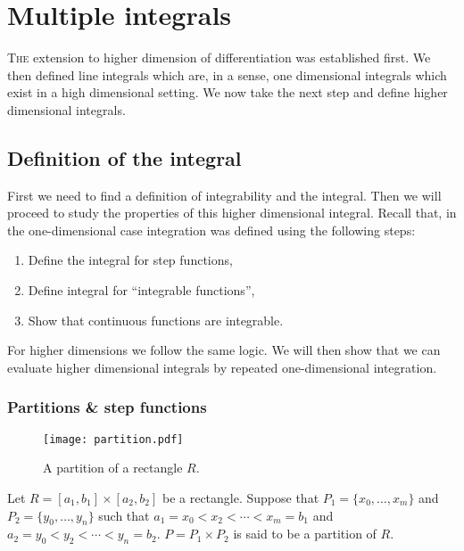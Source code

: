 \chapter{Multiple integrals}

\lettrine{T}{he} extension to higher dimension of differentiation was established first.
We then defined line integrals which are, in a sense, one dimensional integrals which exist in a high dimensional setting.
We now take the next step and define higher dimensional integrals.

\section{Definition of the integral}

First we need to find a definition of integrability and the integral.
Then we will proceed to study the properties of this higher dimensional integral.
Recall that, in the one-dimensional case integration was defined using the following steps:
\begin{enumerate}
    \item Define the integral for step functions,
    \item Define integral for ``integrable functions'',
    \item Show that continuous functions are integrable.
\end{enumerate}
For higher dimensions we follow the same logic.
We will then show that we can evaluate higher dimensional integrals by repeated one-dimensional integration.

\subsection{Partitions \& step functions}

\begin{figure}
    \centering
    \texttt{[image: partition.pdf]}
    \caption{A partition of a rectangle \(R\).}
\end{figure}

\begin{definition*}[partition]
    Let \(R = [a_1,b_1] \times [a_2,b_2]\) be a rectangle.
    Suppose that \(P_1 = \{x_0,\ldots,x_m\}\) and \(P_2 = \{y_0,\ldots,y_n\}\) such that
    \(a_1 = x_0 < x_2 < \cdots < x_m = b_1\) and \(a_2 = y_0 < y_2 < \cdots < y_n = b_2\).
    \(P= P_1 \times P_2\) is said to be a partition of \(R\).
\end{definition*}

